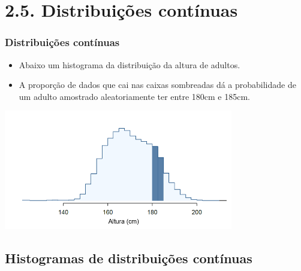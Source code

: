 
\section{2.5. Distribuições contínuas}


\begin{frame}
\frametitle{Distribuições contínuas}

\begin{itemize}
\justifying
\item Abaixo um histograma da distribuição da altura de adultos. 
\justifying
\item A proporção de dados que cai nas caixas sombreadas dá a probabilidade de um adulto amostrado aleatoriamente ter entre 180cm e 185cm.

\end{itemize}

\begin{center}
\includegraphics[width=0.75\textwidth]{2-5_continuous_distributions/usHeightsHist180185.png}
\end{center}


\end{frame}


\subsection{Histogramas de distribuições contínuas}

